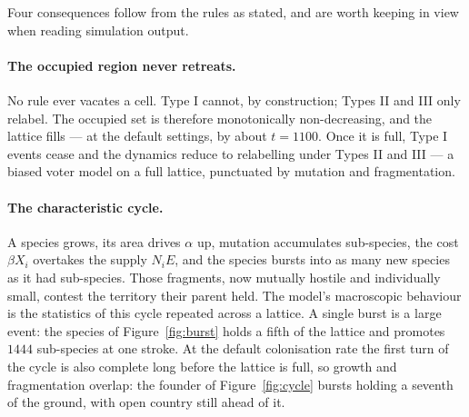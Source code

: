 \documentclass[11pt,a4paper]{article}
\begin{document}
Four consequences follow from the rules as stated, and are worth keeping in view when
reading simulation output.

\paragraph{The occupied region never retreats.} No rule ever vacates a cell. Type I
cannot, by construction; Types II and III only relabel. The occupied set is therefore
monotonically non-decreasing, and the lattice fills --- at the default settings, by about
$t = 1100$. Once it is full, Type I events cease and the dynamics reduce to relabelling
under Types II and III --- a biased voter model on a full lattice, punctuated by mutation
and fragmentation.

\paragraph{The characteristic cycle.} A species grows, its area drives $\alpha$ up,
mutation accumulates sub-species, the cost $\beta X_i$ overtakes the supply $N_i E$, and
the species bursts into as many new species as it had sub-species. Those fragments, now
mutually hostile and individually small, contest the territory their parent held. The
model's macroscopic behaviour is the statistics of this cycle repeated across a lattice.
A single burst is a large event: the species of Figure~\ref{fig:burst} holds a fifth of the
lattice and promotes $1444$ sub-species at one stroke. At the default colonisation rate the
first turn of the cycle is also complete long before the lattice is full, so growth and
fragmentation overlap: the founder of Figure~\ref{fig:cycle} bursts holding a seventh of the
ground, with open country still ahead of it.
\end{document}

